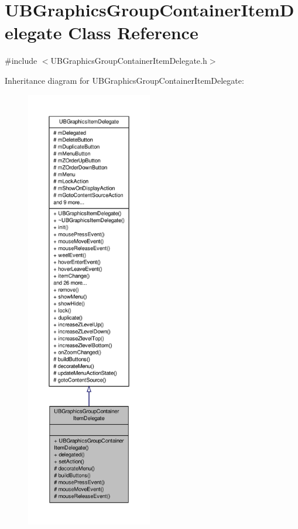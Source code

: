\hypertarget{class_u_b_graphics_group_container_item_delegate}{\section{U\-B\-Graphics\-Group\-Container\-Item\-Delegate Class Reference}
\label{d1/d6a/class_u_b_graphics_group_container_item_delegate}
}


{\ttfamily \#include $<$U\-B\-Graphics\-Group\-Container\-Item\-Delegate.\-h$>$}



Inheritance diagram for U\-B\-Graphics\-Group\-Container\-Item\-Delegate\-:
\nopagebreak
\begin{figure}[H]
\begin{center}
\leavevmode
\includegraphics[height=550pt]{d8/d1e/class_u_b_graphics_group_container_item_delegate__inherit__graph}
\end{center}
\end{figure}


